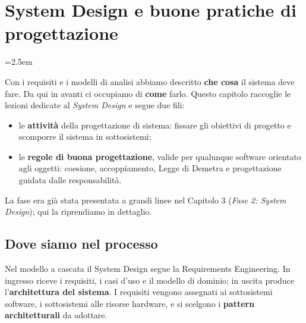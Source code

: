 \chapter{System Design e buone pratiche di progettazione}
\emergencystretch=2.5em

Con i requisiti e i modelli di analisi abbiamo descritto \textbf{che cosa} il sistema deve fare. Da qui in avanti ci occupiamo
di \textbf{come} farlo. Questo capitolo raccoglie le lezioni dedicate al \textit{System Design} e segue due fili:
\begin{itemize}
  \item le \textbf{attività} della progettazione di sistema: fissare gli obiettivi di progetto e scomporre il sistema in
        sottosistemi;
  \item le \textbf{regole di buona progettazione}, valide per qualunque software orientato agli oggetti: coesione,
        accoppiamento, Legge di Demetra e progettazione guidata dalle responsabilità.
\end{itemize}
La fase era già stata presentata a grandi linee nel Capitolo 3 (\textit{Fase 2: System Design}); qui la riprendiamo in
dettaglio.

\section{Dove siamo nel processo}


Nel modello a cascata il System Design segue la Requirements Engineering. In ingresso riceve i requisiti, i casi d'uso e il
modello di dominio; in uscita produce l'\textbf{architettura del sistema}. I requisiti vengono assegnati ai sottosistemi
software, i sottosistemi alle risorse hardware, e si scelgono i \textbf{pattern architetturali} da adottare.


